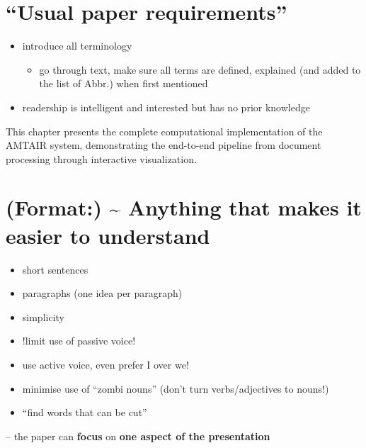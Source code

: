 \documentclass[
  11pt,
  letterpaper,
]{book}
\providecommand{\tightlist}{%
  \setlength{\itemsep}{0pt}\setlength{\parskip}{0pt}}
\begin{document}
\section{``Usual paper requirements''}\label{usual-paper-requirements}

\begin{itemize}
\tightlist
\item
  introduce all terminology

  \begin{itemize}
  \tightlist
  \item
    go through text, make sure all terms are defined, explained (and
    added to the list of Abbr.) when first mentioned\\
  \end{itemize}
\item
  readership is intelligent and interested but has no prior knowledge
\end{itemize}

This chapter presents the complete computational implementation of the
AMTAIR system, demonstrating the end-to-end pipeline from document
processing through interactive visualization.

\section{(Format:) \textasciitilde{} Anything that makes it easier to
understand}\label{format-anything-that-makes-it-easier-to-understand}

\begin{itemize}
\tightlist
\item
  short sentences\\
\item
  paragraphs (one idea per paragraph)\\
\item
  simplicity\\
\item
  !limit use of passive voice!\\
\item
  use active voice, even prefer I over we!\\
\item
  minimise use of ``zombi nouns'' (don't turn verbs/adjectives to
  nouns!)\\
\item
  ``find words that can be cut''
\end{itemize}

-- the paper can \textbf{focus} on \textbf{one aspect of the
presentation}
\end{document}
